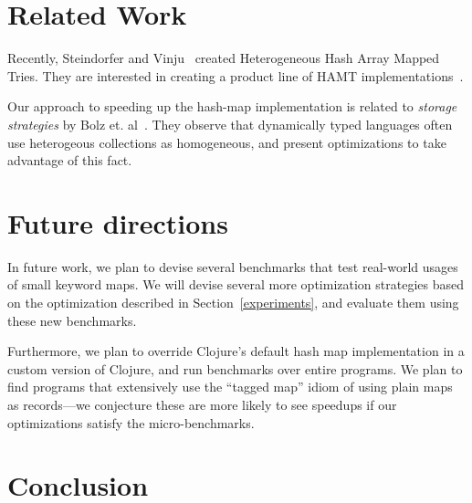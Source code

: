 \documentclass[preprint]{sigplanconf}
\begin{document}
\section{Related Work}

Recently, Steindorfer and Vinju~\cite{Steindorfer:2015:OHM:2814270.2814312}
created Heterogeneous Hash Array Mapped Tries.
They are interested in creating a product line of HAMT
implementations~\cite{Steindorfer:2016:TSP:2993236.2993251}.

Our approach to speeding up the hash-map implementation
is related to \textit{storage strategies}
by Bolz et. al~\cite{Bolz13storagestrategies}.
They observe that dynamically typed languages often use
heterogeous collections as homogeneous, and present
optimizations to take advantage of this fact.



\section{Future directions}

In future work, we plan to devise several benchmarks
that test real-world usages of small keyword maps.
We will devise several more optimization strategies
based on the optimization described in Section~\ref{experiments},
and evaluate them using these new benchmarks.

Furthermore, we plan to override Clojure's default hash map implementation
in a custom version of Clojure, and run benchmarks
over entire programs.
We plan to find programs that extensively use the ``tagged map''
idiom of using plain maps as records---we conjecture these
are more likely to see speedups if our optimizations
satisfy the micro-benchmarks.

\section{Conclusion}

\end{document}
